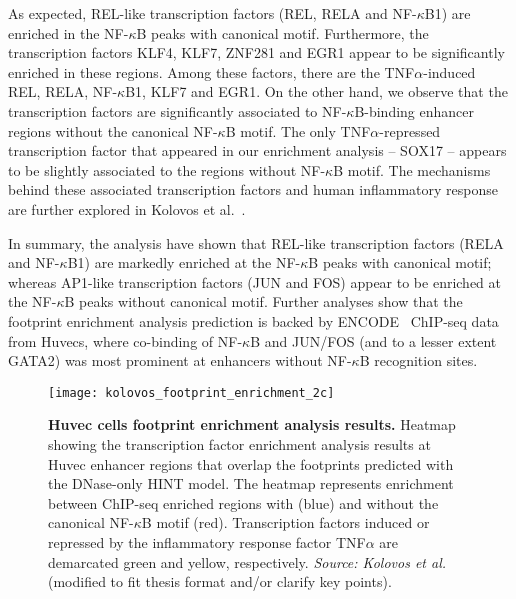 As expected, REL-like transcription factors (REL, RELA and NF-$\kappa$B1) are enriched in the NF-$\kappa$B peaks with canonical motif. Furthermore, the transcription factors KLF4, KLF7, ZNF281 and EGR1 appear to be significantly enriched in these regions. Among these factors, there are the TNF$\alpha$-induced REL, RELA, NF-$\kappa$B1, KLF7 and EGR1. On the other hand, we observe that the transcription factors  are significantly associated to NF-$\kappa$B-binding enhancer regions without the canonical NF-$\kappa$B motif. The only TNF$\alpha$-repressed transcription factor that appeared in our enrichment analysis -- SOX17 -- appears to be slightly associated to the regions without NF-$\kappa$B motif. The mechanisms behind these associated transcription factors and human inflammatory response are further explored in Kolovos et al.~\cite{kolovos2016}.

In summary, the analysis have shown that REL-like transcription factors (RELA and NF-$\kappa$B1) are markedly enriched at the NF-$\kappa$B peaks with canonical motif; whereas AP1-like transcription factors (JUN and FOS) appear to be enriched at the NF-$\kappa$B peaks without canonical motif. Further analyses show that the footprint enrichment analysis prediction is backed by ENCODE~\cite{encode2012} ChIP-seq data from Huvecs, where co-binding of NF-$\kappa$B and JUN/FOS (and to a lesser extent GATA2) was most prominent at enhancers without NF-$\kappa$B recognition sites.

\begin{figure}[h!]
\centering
\texttt{[image: kolovos\_footprint\_enrichment\_2c]}
\caption[Huvec cells footprint enrichment analysis results]{\textbf{Huvec cells footprint enrichment analysis results.} Heatmap showing the transcription factor enrichment analysis results at Huvec enhancer regions that overlap the footprints predicted with the DNase-only HINT model. The heatmap represents enrichment between ChIP-seq enriched regions with (blue) and without the canonical NF-$\kappa$B motif (red). Transcription factors induced or repressed by the inflammatory response factor TNF$\alpha$ are demarcated green and yellow, respectively. \emph{Source: Kolovos et al.}\cite{kolovos2016} (modified to fit thesis format and/or clarify key points).}
\label{fig:kolovos_footprint_enrichment_2c}
\end{figure}

